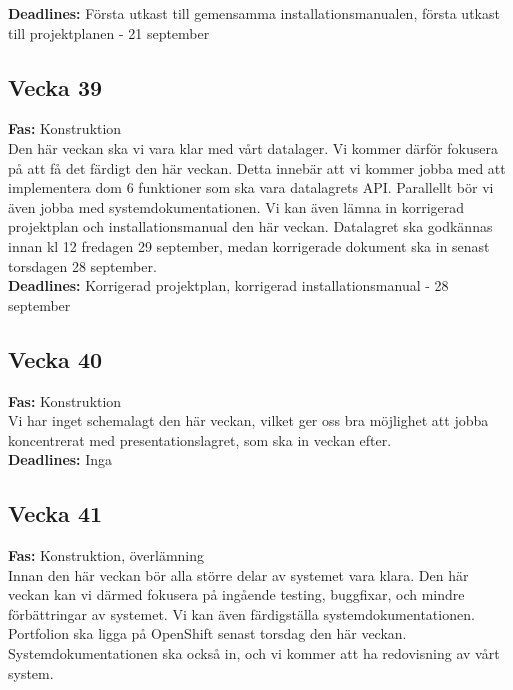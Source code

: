 \documentclass{TDP003mall}
\begin{document}
\textbf{Deadlines:} Första utkast till gemensamma installationsmanualen, första utkast till projektplanen - 21 september

\subsection*{Vecka 39}

\textbf{Fas:} Konstruktion\\

Den här veckan ska vi vara klar med vårt datalager. Vi kommer därför fokusera på att få det färdigt den här veckan. Detta innebär att vi kommer jobba med att implementera dom 6 funktioner som ska vara datalagrets API. Parallellt bör vi även jobba med systemdokumentationen.
Vi kan även lämna in korrigerad projektplan och installationsmanual den här veckan. 
Datalagret ska godkännas innan kl 12 fredagen 29 september, medan korrigerade dokument ska in senast torsdagen 28 september.\\


\textbf{Deadlines:} Korrigerad projektplan, korrigerad installationsmanual - 28 september

\subsection*{Vecka 40}

\textbf{Fas:} Konstruktion\\

Vi har inget schemalagt den här veckan, vilket ger oss bra möjlighet att jobba koncentrerat med presentationslagret, som ska in veckan efter.\\

\textbf{Deadlines:} Inga


\subsection*{Vecka 41}

\textbf{Fas:} Konstruktion, överlämning\\

Innan den här veckan bör alla större delar av systemet vara klara. Den här veckan kan vi därmed fokusera på ingående testing, buggfixar, och mindre förbättringar av systemet. Vi kan även färdigställa systemdokumentationen.
Portfolion ska ligga på OpenShift senast torsdag den här veckan. Systemdokumentationen ska också in, och vi kommer att ha redovisning av vårt system.\\
\end{document}
